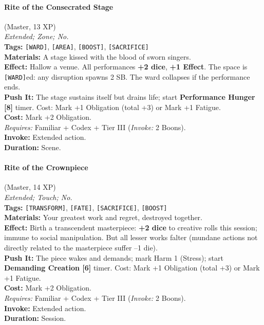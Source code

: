 \paragraph{Rite of the Consecrated Stage} (Master, 13 XP) \hfill \\
\emph{Extended; Zone; No.} \\
\textbf{Tags:} \texttt{[WARD]}, \texttt{[AREA]}, \texttt{[BOOST]}, \texttt{[SACRIFICE]} \\
\textbf{Materials:} A stage kissed with the blood of sworn singers. \\
\textbf{Effect:} Hallow a venue. All performances \textbf{+2 dice}, \textbf{+1 Effect}. The space is \texttt{[WARD]}ed: any disruption spawns 2 SB. The ward collapses if the performance ends. \\
\textbf{Push It:} The stage sustains itself but drains life; start \textbf{Performance Hunger [8]} timer. Cost: Mark +1 Obligation (total +3) or Mark +1 Fatigue. \\
\textbf{Cost:} Mark +2 Obligation. \\
\textit{Requires:} Familiar + Codex + Tier III (\textit{Invoke:} 2 Boons). \\
\textbf{Invoke:} Extended action. \\
\textbf{Duration:} Scene.

\paragraph{Rite of the Crownpiece} (Master, 14 XP) \hfill \\
\emph{Extended; Touch; No.} \\
\textbf{Tags:} \texttt{[TRANSFORM]}, \texttt{[FATE]}, \texttt{[SACRIFICE]}, \texttt{[BOOST]} \\
\textbf{Materials:} Your greatest work and regret, destroyed together. \\
\textbf{Effect:} Birth a transcendent masterpiece: \textbf{+2 dice} to creative rolls this session; immune to social manipulation. But all lesser works falter (mundane actions not directly related to the masterpiece suffer --1 die). \\
\textbf{Push It:} The piece wakes and demands; mark Harm 1 (Stress); start \textbf{Demanding Creation [6]} timer. Cost: Mark +1 Obligation (total +3) or Mark +1 Fatigue. \\
\textbf{Cost:} Mark +2 Obligation. \\
\textit{Requires:} Familiar + Codex + Tier III (\textit{Invoke:} 2 Boons). \\
\textbf{Invoke:} Extended action. \\
\textbf{Duration:} Session.

